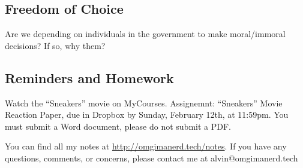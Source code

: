 \documentclass{article}
\begin{document}
\subsection*{Freedom of Choice}
Are we depending on individuals in the government to make moral/immoral
decisions? If so, why them?

\subsection*{Reminders and Homework}
Watch the ``Sneakers'' movie on MyCourses.
Assignemnt: ``Sneakers'' Movie Reaction Paper, due in Dropbox by Sunday,
February 12th, at 11:59pm. You must submit a Word document, please do not
submit a PDF.

\begin{center}
  You can find all my notes at \url{http://omgimanerd.tech/notes}. If you have
  any questions, comments, or concerns, please contact me at
  alvin@omgimanerd.tech
\end{center}
\end{document}
